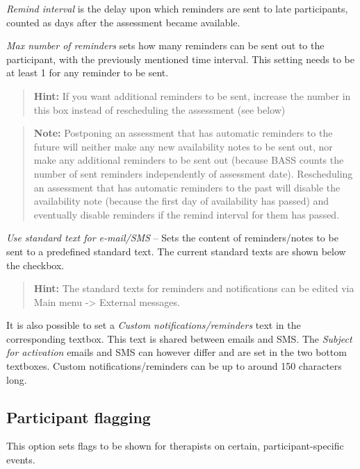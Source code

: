 \documentclass[
]{book}
\begin{document}
\emph{Remind interval} is the delay upon which reminders are sent to late participants, counted as days after the assessment became available.

\emph{Max number of reminders} sets how many reminders can be sent out to the participant, with the previously mentioned time interval. This setting needs to be at least 1 for any reminder to be sent.

\begin{quote}
\textbf{Hint:} If you want additional reminders to be sent, increase the number in this box instead of rescheduling the assessment (see below)
\end{quote}

\begin{quote}
\textbf{Note:} Postponing an assessment that has automatic reminders to the future will neither make any new availability notes to be sent out, nor make any additional reminders to be sent out (because BASS counts the number of sent reminders independently of assessment date). Rescheduling an assessment that has automatic reminders to the past will disable the availability note (because the first day of availability has passed) and eventually disable reminders if the remind interval for them has passed.
\end{quote}

\emph{Use standard text for e-mail/SMS} -- Sets the content of reminders/notes to be sent to a predefined standard text. The current standard texts are shown below the checkbox.

\begin{quote}
\textbf{Hint:} The standard texts for reminders and notifications can be edited via Main menu -\textgreater{} External messages.
\end{quote}

It is also possible to set a \emph{Custom notifications/reminders} text in the corresponding textbox. This text is shared between emails and SMS. The \emph{Subject for activation} emails and SMS can however differ and are set in the two bottom textboxes. Custom notifications/reminders can be up to around 150 characters long.

\subsection{Participant flagging}\label{participant-flagging}

This option sets flags to be shown for therapists on certain, participant-specific events.
\end{document}
